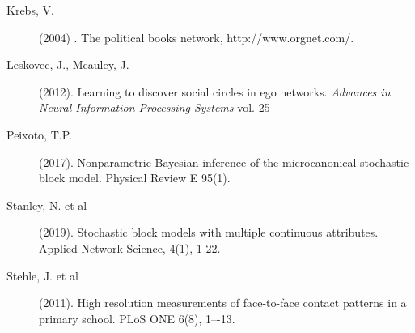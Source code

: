 
\begin{description}

	

	
	\item[Krebs, V.] (2004) . The political books network,
	http://www.orgnet.com/.

	\item[Leskovec, J., Mcauley, J.] (2012).
	Learning to discover social circles in ego networks.
	{\it Advances in Neural Information Processing Systems} vol. 25


	

	\item[Peixoto, T.P.] (2017).
	Nonparametric Bayesian inference of the microcanonical
	stochastic block model. Physical Review E 95(1).


	\item[Stanley, N. et al] (2019). Stochastic block models with multiple continuous attributes. Applied Network Science, 4(1), 1-22.

	\item[Stehle, J. et al] (2011).
	High resolution measurements of face-to-face contact patterns in a primary school.
	PLoS ONE 6(8), 1–-13.

\end{description}